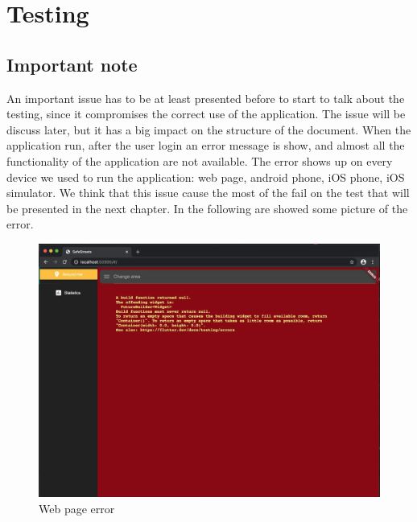 \documentclass[../ATD.tex]{subfiles}
\begin{document}
    \chapter{Testing}\label{ch:testing}
    \section{Important note}\label{sec:important-note}
    An important issue has to be at least presented before to start to talk about the testing, since it compromises the correct use of the application.
    The issue will be discuss later, but it has a big impact on the structure of the document.
    \newline
    When the application run, after the user login an error message is show, and almost all the functionality of the application are not available.
    The error shows up on every device we used to run the application: web page, android phone, iOS phone, iOS simulator.
    We think that this issue cause the most of the fail on the test that will be presented in the next chapter.
    In the following are showed some picture of the error.
    \begin{figure}[H]
        \centering
        \includegraphics{../assets/web_page_error.png}
        \caption{Web page error}
    \end{figure}
\end{document}
